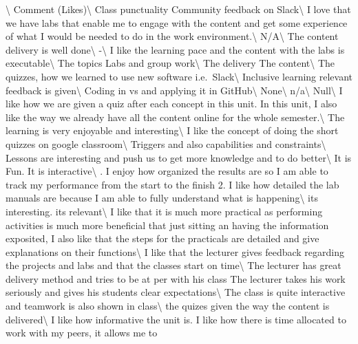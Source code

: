 \documentclass[
]{article}
\begin{document}
\textbackslash{} \toprule Comment (Likes)\textbackslash{} \midrule Class
punctuality Community feedback on Slack\textbackslash{} \hline I love
that we have labs that enable me to engage with the content and get some
experience of what I would be needed to do in the work
environment.\textbackslash{} \hline N/A\textbackslash{} \hline The
content delivery is well done\textbackslash{} \hline -\textbackslash{}
\hline I like the learning pace and the content with the labs is
executable\textbackslash{} \hline The topics Labs and group
work\textbackslash{} \hline The delivery The \vphantom{2}
content\textbackslash{} \hline The quizzes, how we learned to use new
software i.e.~Slack\textbackslash{} \hline Inclusive learning relevant
feedback is given\textbackslash{} \hline Coding in vs and applying it in
GitHub\textbackslash{} \hline None\textbackslash{} \hline
n/a\textbackslash{} \hline Null\textbackslash{} \hline I like how we are
given a quiz after each concept in this unit. In this unit, I also like
the way we already have all the content online for the whole
semester.\textbackslash{} \hline The learning is very enjoyable and
interesting\textbackslash{} \hline I like the concept of doing the short
quizzes on google classroom\textbackslash{} \hline Triggers and also
capabilities and constraints\textbackslash{} \hline Lessons are
interesting and push us to get more knowledge and to do
better\textbackslash{} \hline It is Fun. It is
interactive\textbackslash{} . I enjoy how organized the results are so I am able to track my
performance from the start to the finish 2. I like how detailed the lab
manuals are because I am able to fully understand what is
happening\textbackslash{} \hline its interesting. its
relevant\textbackslash{} \hline I like that it is much more practical as
performing activities is much more beneficial that just sitting an
having the information exposited, I also like that the steps for the
practicals are detailed and give explanations on their
functions\textbackslash{} \hline I like that the lecturer gives feedback
regarding the projects and labs and that the classes start on
time\textbackslash{} \hline The lecturer has great delivery method and
tries to be at per with his class The lecturer takes his work seriously
and gives his students clear expectations\textbackslash{} \hline The
class is quite interactive and teamwork is also shown in
class\textbackslash{} \hline the quizes given the way the content is
delivered\textbackslash{} \hline I like how informative the unit is. I
like how there is time allocated to work with my peers, it allows me to
\end{document}
